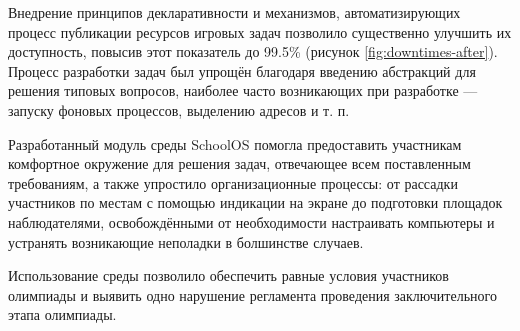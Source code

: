 Внедрение принципов декларативности и механизмов, автоматизирующих процесс публикации ресурсов игровых задач позволило существенно улучшить их доступность, повысив этот показатель до 99.5\% (рисунок \ref{fig:downtimes-after}). Процесс разработки задач был упрощён благодаря введению абстракций для решения типовых вопросов, наиболее часто возникающих при разработке --- запуску фоновых процессов, выделению адресов и т. п.

Разработанный модуль среды SchoolOS помогла предоставить участникам комфортное окружение для решения задач, отвечающее всем поставленным требованиям, а также упростило организационные процессы: от рассадки участников по местам с помощью индикации на экране до подготовки площадок наблюдателями, освобождёнными от необходимости настраивать компьютеры и устранять возникающие неполадки в болшинстве случаев.

Использование среды позволило обеспечить равные условия участников олимпиады и выявить одно нарушение регламента проведения заключительного этапа олимпиады.
